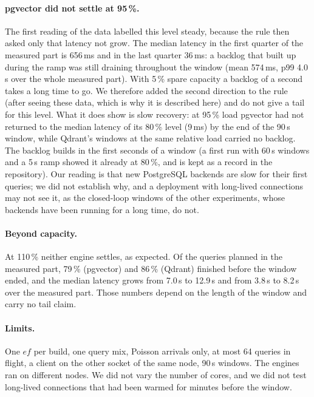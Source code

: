 \documentclass[preprint,12pt]{elsarticle}
\begin{document}
\paragraph{pgvector did not settle at 95\,\%.} The first reading of the data labelled this level steady, because the rule then asked only that latency
not grow. The median latency in the first quarter of the measured part is 656\,ms and in the last quarter 36\,ms:
a backlog that built up during the ramp was still draining throughout the window (mean 574\,ms, p99 4.0\,s over the whole measured part).
With 5\,\% spare capacity a backlog of a second takes a long time to go. We therefore added the second direction to the rule (after seeing these
data, which is why it is described here) and do not give a tail for this level. What it does show is slow recovery: at 95\,\% load pgvector had not returned to the median latency of its 80\,\% level
(9\,ms) by the end of the 90\,s window, while Qdrant's windows at the same relative load carried no backlog. The backlog builds in the first
seconds of a window (a first run with 60\,s windows and a 5\,s ramp showed it already at 80\,\%, and is kept as a record in the repository).
Our reading is that new PostgreSQL backends are slow for their first queries; we did not establish why, and a deployment with long-lived connections
may not see it, as the closed-loop windows of the other experiments, whose backends have been running for a long time, do not.

\paragraph{Beyond capacity.} At 110\,\% neither engine settles, as expected. Of the queries planned in the measured part, 79\,\% (pgvector) and 86\,\% (Qdrant)
finished before the window ended, and the median latency grows from 7.0\,s to 12.9\,s and from 3.8\,s to 8.2\,s over the
measured part. Those numbers depend on the length of the window and carry no tail claim.

\paragraph{Limits.} One $ef$ per build, one query mix, Poisson arrivals only, at most 64 queries in flight, a client on the other socket of the same node, 90\,s windows. The
engines ran on different nodes. We did not vary the number of cores, and we did not test long-lived connections that had been warmed for minutes before the window.
\end{document}
